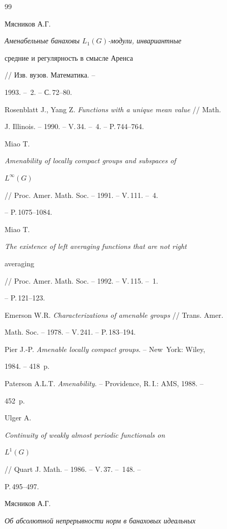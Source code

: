 \begin{thebibliography}{99}







Мясников А.Г. {\em Аменабельные банаховы $L_1(G)$-модули, инвариантные


средние и регулярность в смысле Аренса} // Изв. вузов. Математика. --


1993. -- \No\,2. -- С.\,72--80.




Rosenblatt J., Yang Z. {\em Functions with a unique mean value} // Math.


J. Illinois. -- 1990. -- V.\,34. -- \No\,4. -- P.\,744--764.




Miao T. {\em Amenability of locally compact groups and subspaces of


$L^\infty(G)$} // Proc. Amer. Math. Soc. -- 1991. -- V.\,111. -- \No\,4.


-- P.\,1075--1084.




Miao T. {\em The existence of left averaging functions that are not right


averaging} // Proc. Amer. Math. Soc. -- 1992. -- V.\,115. -- \No\,1.


-- P.\,121--123.




Emerson W.R. {\em Characterizations of amenable groups} // Trans. Amer.


Math. Soc. -- 1978. -- V.\,241. -- P.\,183--194.




Pier J.-P. {\em Amenable locally compact groups}. -- New~York: Wiley,


1984. -- 418~p.




Paterson A.L.T. {\em Amenability}. -- Providence, R.\,I.: AMS, 1988. --


452~p.




Ulger A. {\em Continuity of weakly almost periodic functionals on


$L^1(G)$} // Quart J. Math. -- 1986. -- V.\,37. -- \No\,148. --


P.\,495--497.




Мясников А.Г. {\em Об абсолютной непрерывности норм в банаховых идеальных


}
\end{thebibliography}
